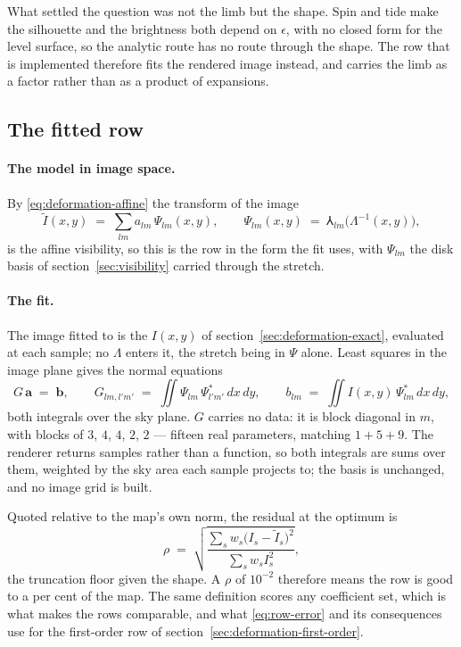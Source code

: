 What settled the question was not the limb but the shape.  Spin and tide make the silhouette
and the brightness both depend on $\epsilon$, with no closed form for the level surface, so
the analytic route has no route through the shape.  The row that is implemented therefore fits
the rendered image instead, and carries the limb as a factor rather than as a product of
expansions.

\subsection{The fitted row}
\label{sec:deformation-fitted}

\paragraph{The model in image space.}  By \eqref{eq:deformation-affine} the transform of the
image
\begin{equation}
  \tilde I(x,y) \;=\; \sum_{lm} a_{lm}\,\Psi_{lm}(x,y) ,
  \qquad \Psi_{lm}(x,y) \;=\; \Yup_{lm}\bigl(\Lambda^{-1}(x,y)\bigr) ,
  \label{eq:fitted-model-image}
\end{equation}
is the affine visibility, so this is the row in the form the fit uses, with $\Psi_{lm}$ the disk
basis of section~\ref{sec:visibility} carried through the stretch.

\paragraph{The fit.}  The image fitted to is the $I(x,y)$ of
section~\ref{sec:deformation-exact}, evaluated at each sample; no $\Lambda$ enters it, the stretch
being in $\Psi$ alone.  Least squares in the image plane gives the
normal equations
\begin{equation}
  G\,\mathbf{a} \;=\; \mathbf{b} ,
  \qquad
  G_{lm,l'm'} \;=\; \iint \Psi_{lm}\,\Psi_{l'm'}^*\,dx\,dy ,
  \qquad
  b_{lm} \;=\; \iint I(x,y)\,\Psi_{lm}^*\,dx\,dy ,
  \label{eq:fitted-normal-equations}
\end{equation}
both integrals over the sky plane.  $G$ carries no data: it is block diagonal in $m$, with blocks
of $3$, $4$, $4$, $2$, $2$ --- fifteen real parameters, matching $1+5+9$.  The renderer returns
samples rather than a function, so both integrals are sums over them, weighted by the sky area
each sample projects to; the basis is unchanged, and no image grid is built.

Quoted relative to the map's own norm, the residual at the optimum is
\begin{equation}
  \rho \;=\; \sqrt{\frac{\sum_s w_s\bigl(I_s - \tilde I_s\bigr)^{2}}{\sum_s w_s I_s^{2}}} ,
  \label{eq:relative-residual}
\end{equation}
the truncation floor given the shape.  A $\rho$ of $10^{-2}$ therefore means the row is good to a
per cent of the map.  The same definition scores any coefficient set, which is what makes the rows
comparable, and what \eqref{eq:row-error} and its consequences use for the first-order row of
section~\ref{sec:deformation-first-order}.

